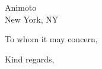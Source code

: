 \documentclass[]{letter}
\newcommand{\companyname}{Animoto}
\newcommand{\city}{New York}
\newcommand{\stateshort}{NY}
\newcommand{\zipcode}{}
\begin{document}
	
	\begin{letter}{\companyname{} \\
			\city{}, \stateshort{} \zipcode{}
			
			
		}
		\address{8404 Glaser Ln \\ Louisville, KY 40291}
		
		\opening{To whom it may concern,}
		
		
		
		
		
		 
		
		 
		
%		 
		
		
		
		
		
		\signature{Jacob Archambault}
		
		\closing{Kind regards,}
		
		
	\end{letter}
\end{document}
